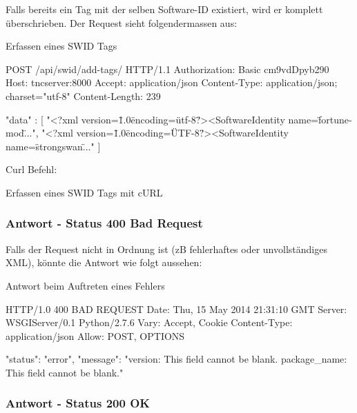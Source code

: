 \documentclass[10pt,a4paper]{scrartcl}
\begin{document}
Falls bereits ein Tag mit der selben Software-ID existiert, wird er komplett
überschrieben. Der Request sieht folgendermassen aus:

\begin{listing}[H]
\caption{Erfassen eines SWID Tags}
\begin{httpcode}
POST /api/swid/add-tags/ HTTP/1.1
Authorization: Basic cm9vdDpyb290
Host: tncserver:8000
Accept: application/json
Content-Type: application/json; charset="utf-8"
Content-Length: 239

{ "data" : 
	[
		"<?xml version=\"1.0\" encoding=\"utf-8\"?><SoftwareIdentity name=\"fortune-mod\"...",
		"<?xml version=\"1.0\" encoding=\"UTF-8\"?><SoftwareIdentity name=\"strongswan\"..."
	]
}
\end{httpcode}
\end{listing}
\pagebreak
Curl Befehl:

\begin{listing}[H]
\caption{Erfassen eines SWID Tags mit cURL}
\end{listing}


\subsubsection{Antwort - Status 400 Bad Request}

Falls der Request nicht in Ordnung ist (zB fehlerhaftes oder unvollständiges
XML), könnte die Antwort wie folgt aussehen:

\begin{listing}
\caption{Antwort beim Auftreten eines Fehlers}
\begin{httpcode}
HTTP/1.0 400 BAD REQUEST
Date: Thu, 15 May 2014 21:31:10 GMT
Server: WSGIServer/0.1 Python/2.7.6
Vary: Accept, Cookie
Content-Type: application/json
Allow: POST, OPTIONS

{
	"status": "error", 
	"message": "version: This field cannot be blank. package_name: This field cannot be blank."
}
\end{httpcode}
\end{listing}


\subsubsection{Antwort - Status 200 OK}
\end{document}

